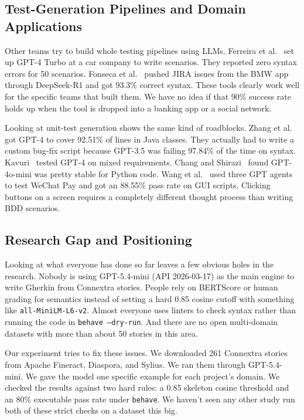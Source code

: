 \subsection{Test-Generation Pipelines and Domain Applications}
\label{subsec:rw-pipelines}

Other teams try to build whole testing pipelines using LLMs. Ferreira et al.~\cite{ferreira2025industrialcasestudy} set up GPT-4 Turbo at a car company to write scenarios. They reported zero syntax errors for 50 scenarios. Fonseca et al.~\cite{fonseca2025mobileacceptance} pushed JIRA issues from the BMW app through DeepSeek-R1 and got 93.3\% correct syntax. These tools clearly work well for the specific teams that built them. We have no idea if that 90\% success rate holds up when the tool is dropped into a banking app or a social network.

Looking at unit-test generation shows the same kind of roadblocks. Zhang et al.~\cite{zhang2024testbench} got GPT-4 to cover 92.51\% of lines in Java classes. They actually had to write a custom bug-fix script because GPT-3.5 was failing 97.84\% of the time on syntax. Kavuri~\cite{kavuri2022testscriptautomation} tested GPT-4 on mixed requirements. Chang and Shirazi~\cite{chang2025llmassessment} found GPT-4o-mini was pretty stable for Python code. Wang et al.~\cite{wang2024xuatcopilot} used three GPT agents to test WeChat Pay and got an 88.55\% pass rate on GUI scripts. Clicking buttons on a screen requires a completely different thought process than writing BDD scenarios.

\subsection{Research Gap and Positioning}
\label{subsec:rw-gap}

Looking at what everyone has done so far leaves a few obvious holes in the research. Nobody is using GPT-5.4-mini (API 2026-03-17) as the main engine to write Gherkin from Connextra stories. People rely on BERTScore or human grading for semantics instead of setting a hard 0.85 cosine cutoff with something like \texttt{all-MiniLM-L6-v2}. Almost everyone uses linters to check syntax rather than running the code in \texttt{behave --dry-run}. And there are no open multi-domain datasets with more than about 50 stories in this area.

Our experiment tries to fix these issues. We downloaded 261 Connextra stories from Apache Fineract, Diaspora, and Sylius. We ran them through GPT-5.4-mini. We gave the model one specific example for each project's domain. We checked the results against two hard rules: a 0.85 skeleton cosine threshold and an 80\% executable pass rate under \texttt{behave}. We haven't seen any other study run both of these strict checks on a dataset this big.
